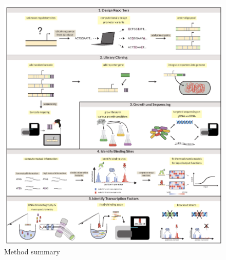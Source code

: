 \begin{figure}
    \centering
    \includegraphics{../figures/figure2_method_sum.pdf}
    \caption{Method summary}
    \label{fig:method_sum}
\end{figure}




